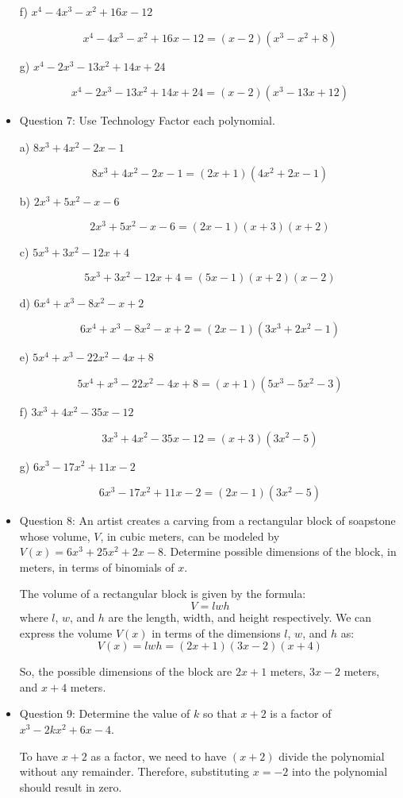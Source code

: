 \documentclass{article}
\begin{document}
\begin{itemize}
f) $x^4-4x^3-x^2+16x-12$

\[
x^4 - 4x^3 - x^2 + 16x - 12 = (x - 2)(x^3 - x^2 + 8)
\]

g) $x^4-2x^3-13x^2+14x+24$

\[
x^4 - 2x^3 - 13x^2 + 14x + 24 = (x - 2)(x^3 - 13x + 12)
\]
\item Question 7:
Use Technology Factor each polynomial.

a) $8x^3+4x^2-2x-1$

\[
8x^3 + 4x^2 - 2x - 1 = (2x + 1)(4x^2 + 2x - 1)
\]

b) $2x^3+5x^2-x-6$

\[
2x^3 + 5x^2 - x - 6 = (2x - 1)(x + 3)(x + 2)
\]

c) $5x^3+3x^2-12x+4$

\[
5x^3 + 3x^2 - 12x + 4 = (5x - 1)(x + 2)(x - 2)
\]

d) $6x^4+x^3-8x^2-x+2$

\[
6x^4 + x^3 - 8x^2 - x + 2 = (2x - 1)(3x^3 + 2x^2 - 1)
\]

e) $5x^4+x^3-22x^2-4x+8$

\[
5x^4 + x^3 - 22x^2 - 4x + 8 = (x + 1)(5x^3 - 5x^2 - 3)
\]

f) $3x^3+4x^2-35x-12$

\[
3x^3 + 4x^2 - 35x - 12 = (x + 3)(3x^2 - 5)
\]

g) $6x^3-17x^2+11x-2$

\[
6x^3 - 17x^2 + 11x - 2 = (2x - 1)(3x^2 - 5)
\]


\item Question 8:
 An artist creates a carving from a rectangular block of soapstone whose volume, $V$, in cubic meters, can be modeled by $V(x)=6x^3 + 25x^2 + 2x - 8$. Determine possible dimensions of the block, in meters, in terms of binomials of $x$.

The volume of a rectangular block is given by the formula: \[ V = lwh \] where $l$, $w$, and $h$ are the length, width, and height respectively. We can express the volume $V(x)$ in terms of the dimensions $l$, $w$, and $h$ as: \[ V(x) = lwh = (2x + 1)(3x - 2)(x + 4) \]

So, the possible dimensions of the block are $2x + 1$ meters, $3x - 2$ meters, and $x + 4$ meters.
\item Question 9:
Determine the value of $k$ so that $x + 2$ is a factor of $x^3 - 2kx^2 + 6x - 4$.

To have $x + 2$ as a factor, we need to have $(x + 2)$ divide the polynomial without any remainder. Therefore, substituting $x = -2$ into the polynomial should result in zero.


\end{itemize}
\end{document}
